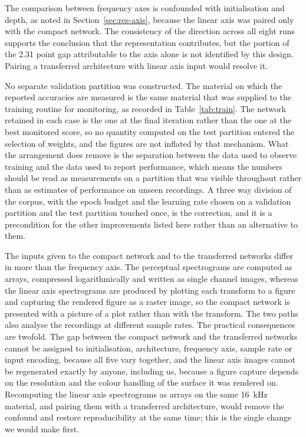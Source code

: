 The comparison between frequency axes is confounded with initialisation and
depth, as noted in Section~\ref{sec:res-axis}, because the linear axis was
paired only with the compact network. The consistency of the direction across
all eight runs supports the conclusion that the representation contributes,
but the portion of the 2.31 point gap attributable to the axis alone is not
identified by this design. Pairing a transferred architecture with linear axis
input would resolve it.

No separate validation partition was constructed. The material on which the
reported accuracies are measured is the same material that was supplied to the
training routine for monitoring, as recorded in Table~\ref{tab:train}. The
network retained in each case is the one at the final iteration rather than
the one at the best monitored score, so no quantity computed on the test
partition entered the selection of weights, and the figures are not inflated
by that mechanism. What the arrangement does remove is the separation between
the data used to observe training and the data used to report performance,
which means the numbers should be read as measurements on a partition that was
visible throughout rather than as estimates of performance on unseen
recordings. A three way division of the corpus, with the epoch budget and the
learning rate chosen on a validation partition and the test partition touched
once, is the correction, and it is a precondition for the other improvements
listed here rather than an alternative to them.

The inputs given to the compact network and to the transferred networks differ
in more than the frequency axis. The perceptual spectrograms are computed as
arrays, compressed logarithmically and written as single channel images,
whereas the linear axis spectrograms are produced by plotting each transform
to a figure and capturing the rendered figure as a raster image, so the
compact network is presented with a picture of a plot rather than with the
transform. The two paths also analyse the recordings at different sample
rates. The practical consequences are twofold. The gap between the compact
network and the transferred networks cannot be assigned to initialisation,
architecture, frequency axis, sample rate or input encoding, because all five
vary together, and the linear axis images cannot be regenerated exactly by
anyone, including us, because a figure capture depends on the resolution and
the colour handling of the surface it was rendered on. Recomputing the linear
axis spectrograms as arrays on the same 16~kHz material, and pairing them with
a transferred architecture, would remove the confound and restore
reproducibility at the same time; this is the single change we would make
first.

